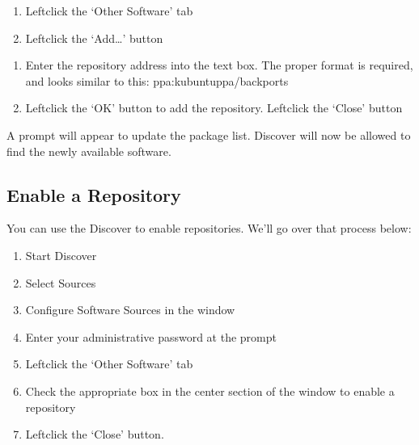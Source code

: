 \documentclass[letterpaper,10pt,english]{sphinxmanual}
\begin{document}
\begin{enumerate}
%
\setcounter{enumi}{3}
\item {} 
\sphinxAtStartPar
Left\sphinxhyphen{}click the ‘Other Software’ tab

\item {} 
\sphinxAtStartPar
Left\sphinxhyphen{}click the ‘Add…’ button

\end{enumerate}

\begin{enumerate}
%
\setcounter{enumi}{5}
\item {} 
\sphinxAtStartPar
Enter the repository address into the text box. The proper format is required, and looks similar to this: ppa:kubuntu\sphinxhyphen{}ppa/backports

\item {} 
\sphinxAtStartPar
Left\sphinxhyphen{}click the ‘OK’ button to add the repository. Left\sphinxhyphen{}click the ‘Close’ button

\end{enumerate}

\sphinxAtStartPar
A prompt will appear to update the package list. Discover will now be allowed to find the newly available software.


\subsection{Enable a Repository}
\label{\detokenize{docs/repositories:enable-a-repository}}
\sphinxAtStartPar
You can use the Discover to enable repositories. We’ll go over that process below:
\begin{enumerate}
%
\item {} 
\sphinxAtStartPar
Start Discover

\item {} 
\sphinxAtStartPar
Select Sources

\item {} 
\sphinxAtStartPar
Configure Software Sources in the window

\item {} 
\sphinxAtStartPar
Enter your administrative password at the prompt

\item {} 
\sphinxAtStartPar
Left\sphinxhyphen{}click the ‘Other Software’ tab

\item {} 
\sphinxAtStartPar
Check the appropriate box in the center section of the window to enable a repository

\item {} 
\sphinxAtStartPar
Left\sphinxhyphen{}click the ‘Close’ button.

\end{enumerate}
\end{document}
